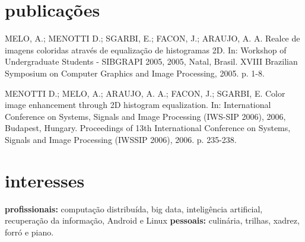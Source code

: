 \documentclass[]{friggeri-cv}
\begin{document}
\section{publicações}

MELO, A.; MENOTTI D.; SGARBI, E.; FACON, J.; ARAUJO, A. A. Realce de imagens coloridas através de equalização de histogramas 2D. In: Workshop of Undergraduate Students - SIBGRAPI 2005, 2005, Natal, Brasil. XVIII Brazilian Symposium on Computer Graphics and Image Processing, 2005. p. 1-8.

MENOTTI D.; MELO, A.; ARAUJO, A. A.; FACON, J.; SGARBI, E. Color image enhancement through 2D histogram equalization. In: International Conference on Systems, Signals and Image Processing (IWS-SIP 2006), 2006, Budapest, Hungary. Proceedings of 13th International Conference on Systems, Signals and Image Processing (IWSSIP 2006), 2006. p. 235-238.

\section{interesses}

\textbf{profissionais:} computação distribuída, big data, inteligência artificial, recuperação da informação, Android e Linux \textbf{pessoais:} culinária, trilhas,  xadrez, forró e piano.
\end{document}
